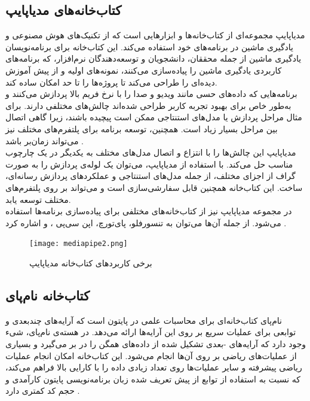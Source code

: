 \subsection[کتاب‌خانه‌های مدیاپایپ]{کتاب‌خانه‌های مدیاپایپ \protect{}}
مدیاپایپ مجموعه‌ای از کتاب‌خانه‌ها و ابزارهایی است که از تکنیک‌های هوش مصنوعی و یادگیری ماشین در برنامه‌های خود استفاده می‌کند. این کتاب‌خانه برای برنامه‌نویسان یادگیری ماشین از جمله محققان، دانشجویان و توسعه‌دهندگان
 نرم‌افزار، که برنامه‌های کاربردی یادگیری ماشین را پیاده‌سازی می‌کنند، نمونه‌های اولیه و از پیش آموزش دیده‌ای را طراحی می‌کند تا پروژه‌ها را تا حد امکان ساده کند.
\\
برنامه‌هایی که داده‌های حسی مانند ویدیو و صدا را با نرخ فریم بالا پردازش می‌کنند و به‌طور خاص برای بهبود تجربه کاربر
 طراحی شده‌اند چالش‌های مختلفی دارند. برای مثال مراحل پردازش یا مدل‌های استنتاجی ممکن است پیچیده باشند، زیرا گاهی اتصال بین مراحل بسیار زیاد است. همچنین، توسعه برنامه برای پلتفرم‌های مختلف نیز می‌تواند زمان‌بر باشد \cite{lugaresi2019mediapipe}. 
\\
مدیاپایپ این چالش‌ها را با انتزاع و اتصال مدل‌های مختلف به یکدیگر در یک چارچوب مناسب حل می‌کند. با استفاده از مدیاپایپ، می‌توان یک لوله‌ی پردازش را به صورت گراف از اجزای مختلف، از جمله مدل‌های استنتاجی و عملکردهای پردازش رسانه‌ای، ساخت. این کتاب‌خانه همچنین قابل سفارشی‌سازی است و می‌تواند بر روی پلتفرم‌های مختلف توسعه یابد.
\\
در مجموعه مدیاپایپ نیز از کتاب‌خانه‌های مختلفی برای پیاده‌سازی برنامه‌ها استفاده می‌شود. از جمله آن‌ها می‌توان به تنسورفلو، پای‌تورچ، اپن سی‌پی
،  و  اشاره کرد \cite{harris2021applying}.


\begin{figure}[h]
    \centering
    \texttt{[image: mediapipe2.png]}
    \caption[برخی کاربردهای کتاب‌خانه مدیاپایپ]{برخی کاربردهای کتاب‌خانه مدیاپایپ \cite{harris2021applying}}
\end{figure}

\subsection{کتاب‌خانه نام‌پای}
نام‌پای کتاب‌خانه‌ای برای محاسبات علمی در پایتون است که آرایه‌های چندبعدی و توابعی برای عملیات سریع  بر روی این آرایه‌ها ارائه می‌دهد. در هسته‌ی نام‌پای، شیء  وجود 
دارد که آرایه‌های -بعدی تشکیل شده از داده‌های همگن را در بر می‌گیرد و بسیاری از عملیات‌های ریاضی بر روی آن‌ها انجام می‌شود. این کتاب‌خانه امکان انجام عملیات ریاضی پیشرفته و سایر 
عملیات‌ها روی تعداد زیادی داده را با کارایی بالا فراهم می‌کند، که نسبت به استفاده از توابع از پیش تعریف شده زبان برنامه‌نویسی پایتون کارآمدی و حجم کد کمتری دارد \cite{WhatisNu62:online}.

